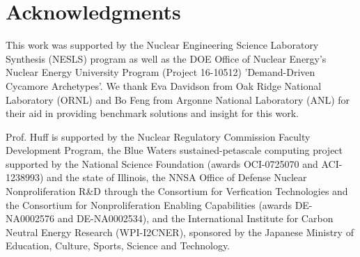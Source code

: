 \section{Acknowledgments}
This work was supported by the Nuclear Engineering Science Laboratory Synthesis 
(NESLS) program as well as the DOE Office of Nuclear Energy's Nuclear Energy 
University Program (Project 16-10512) 'Demand-Driven Cycamore Archetypes'. We 
thank Eva Davidson from Oak Ridge National Laboratory (ORNL) and Bo Feng from 
Argonne National Laboratory (ANL) for their aid in providing benchmark 
solutions and insight for this work.

Prof. Huff is supported by the Nuclear Regulatory Commission Faculty 
Development Program, the Blue Waters sustained-petascale computing project 
supported by the National Science Foundation (awards OCI-0725070 and 
ACI-1238993) and the state of Illinois, the NNSA Office of Defense Nuclear 
Nonproliferation R\&D through the Consortium for Verfication Technologies and 
the Consortium for Nonproliferation Enabling Capabilities (awards DE-NA0002576 
and DE-NA0002534), and the International Institute for Carbon Neutral Energy 
Research (WPI-I2CNER), sponsored by the Japanese Ministry of Education, 
Culture, Sports, Science and Technology.


